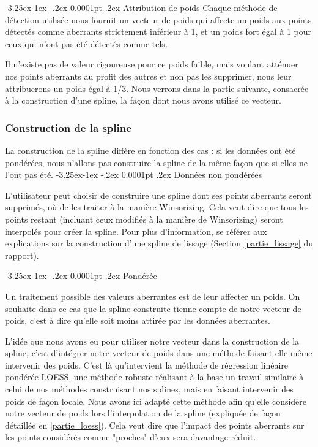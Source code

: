 \documentclass[a4paper,12pt]{article} %
\makeatletter
\renewcommand\paragraph{\@startsection{paragraph}{4}{\z@}%
                                      {-3.25ex\@plus -1ex \@minus -.2ex}%
                                      {0.0001pt \@plus .2ex}%
                                      {\normalfont\normalsize\bfseries}}
\makeatother
\begin{document}
					\paragraph{Attribution de poids}
					    Chaque méthode de détection utilisée nous fournit un vecteur de poids qui affecte un poids aux points détectés comme aberrants strictement inférieur à 1, et un poids fort égal à 1 pour ceux qui n'ont pas été détectés comme tels.
					    
					    Il n'existe pas de valeur rigoureuse pour ce poids faible, mais voulant atténuer nos points aberrants au profit des autres et non pas les supprimer, nous leur attribuerons un poids égal à 1/3. Nous verrons dans la partie suivante, consacrée à la construction d'une spline, la façon dont nous avons utilisé ce vecteur.
				
					    
			    \subsubsection{Construction de la spline}
			        La construction de la spline diffère en fonction des cas : si les données ont été pondérées, nous n'allons pas construire la spline de la même façon que si elles ne l'ont pas été.
			        \paragraph{Données non pondérées}
			        
    			        L'utilisateur peut choisir de construire une spline dont ses points aberrants seront supprimés, où de les traiter à la manière Winsorizing. Cela veut dire que tous les points restant (incluant ceux modifiés à la manière de Winsorizing) seront interpolés pour créer la spline. Pour plus d'information, se référer aux explications sur la construction d'une spline de lissage (Section \ref{partie_lissage} du rapport).
    			        
			        \paragraph{Pondérée}
			        
    			        Un traitement possible des valeurs aberrantes est de leur affecter un poids. On souhaite dans ce cas que la spline construite tienne compte de notre vecteur de poids, c'est à dire qu'elle soit moins attirée par les données aberrantes.
                        
                        L'idée que nous avons eu pour utiliser notre vecteur dans la construction de la spline, c'est d'intégrer notre vecteur de poids dans une méthode faisant elle-même intervenir des poids. C'est là qu'intervient la méthode de régression linéaire pondérée LOESS, une méthode robuste réalisant à la base un travail similaire à celui de nos méthodes construisant nos splines, mais en faisant intervenir des poids de façon locale.  Nous avons ici adapté cette méthode afin qu'elle considère notre vecteur de poids lors l'interpolation de la spline (expliquée de façon détaillée en \ref{partie_loess}). Cela veut dire que l'impact des points aberrants sur les points considérés comme "proches" d'eux sera davantage réduit.
					   
\end{document}
